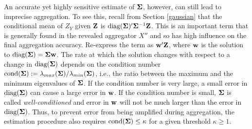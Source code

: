 \documentclass[11pt]{article}
\theoremstyle{definition}
\theoremstyle{definition}
\def\bSigma{{\bf \Sigma}}
\def\w{{\bf w}}
\def\Z{{\bf Z}}
\def\cond{\text{cond}}
\def\diag{\text{diag}}
\def\diag{\text{diag}}
\begin{document}
An accurate yet highly sensitive estimate of $\bSigma$, however, can still lead to imprecise aggregation. To see this, recall from Section \ref{gaussian} that the conditional mean of $Z_Y$ given $\Z$ is  $\diag(\bSigma)' \bSigma^{-1} \Z$. 
This is an important term that is generally found in the revealed aggregator $X''$ and so has high influence on the final aggregation accuracy. 
 Re-express the term as $\w' \Z$, where $\w$ is the solution to $\diag(\bSigma) = \bSigma \w$. The rate at which the solution changes with respect to a change in $\diag(\bSigma)$ depends on the condition number $\cond(\bSigma) := \lambda_{max}(\bSigma) / \lambda_{min}(\bSigma)$, i.e., the ratio between the maximum and the minimum eigenvalues of $\bSigma$. If the condition number is very large, a small error in $\diag(\bSigma)$ can cause a large error in $\w$. If the condition number is small, $\bSigma$ is called \textit{well-conditioned} and error in $\w$ will not be much larger than the error in $\diag(\bSigma)$. Thus, to prevent error from being amplified during aggregation, the estimation procedure also requires $\cond(\bSigma) \leq \kappa$ for a given threshold $\kappa \geq 1$. 
 
 
 
% 


\end{document}
